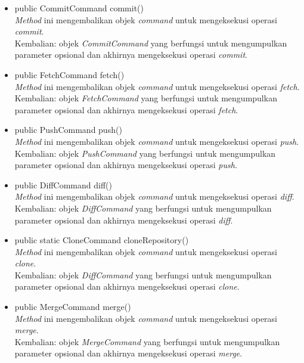 \begin{itemize}
\item public CommitCommand commit()\\
\textit{Method} ini mengembalikan objek \textit{command} untuk mengeksekusi operasi \textit{commit}.\\
Kembalian: objek \textit{CommitCommand} yang berfungsi untuk mengumpulkan parameter opsional dan akhirnya mengeksekusi operasi \textit{commit}.

\item public FetchCommand fetch()\\
\textit{Method} ini mengembalikan objek \textit{command} untuk mengeksekusi operasi \textit{fetch}.\\
Kembalian: objek \textit{FetchCommand} yang berfungsi untuk mengumpulkan parameter opsional dan akhirnya mengeksekusi operasi \textit{fetch}.

\item public PushCommand push()\\
\textit{Method} ini mengembalikan objek \textit{command} untuk mengeksekusi operasi \textit{push}.\\
Kembalian: objek \textit{PushCommand} yang berfungsi untuk mengumpulkan parameter opsional dan akhirnya mengeksekusi operasi \textit{push}.

\item public DiffCommand diff()\\
\textit{Method} ini mengembalikan objek \textit{command} untuk mengeksekusi operasi \textit{diff}.\\
Kembalian: objek \textit{DiffCommand} yang berfungsi untuk mengumpulkan parameter opsional dan akhirnya mengeksekusi operasi \textit{diff}.

\item public static CloneCommand cloneRepository()\\
\textit{Method} ini mengembalikan objek \textit{command} untuk mengeksekusi operasi \textit{clone}.\\
Kembalian: objek \textit{DiffCommand} yang berfungsi untuk mengumpulkan parameter opsional dan akhirnya mengeksekusi operasi \textit{clone}.

\item public MergeCommand merge()\\
\textit{Method} ini mengembalikan objek \textit{command} untuk mengeksekusi operasi \textit{merge}.\\
Kembalian: objek \textit{MergeCommand} yang berfungsi untuk mengumpulkan parameter opsional dan akhirnya mengeksekusi operasi \textit{merge}.


\end{itemize}
